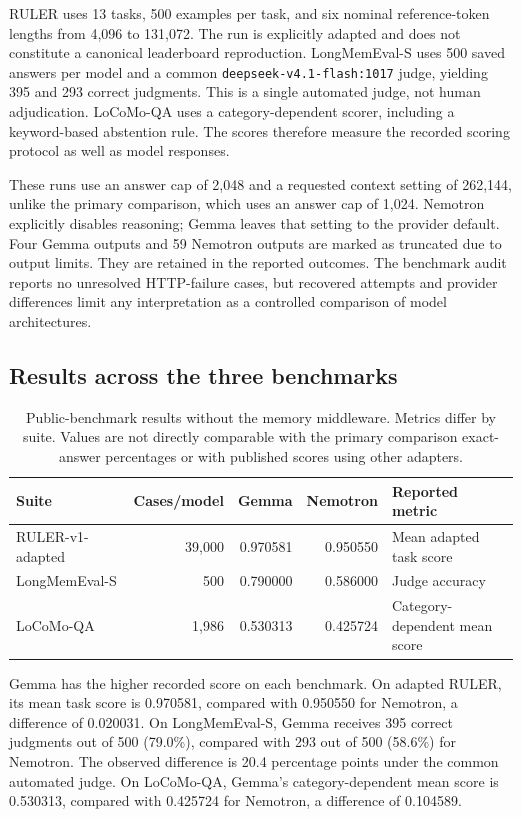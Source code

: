 \documentclass[11pt,a4paper]{article}
\begin{document}
RULER uses 13 tasks, 500 examples per task, and six nominal reference-token lengths from 4,096 to 131,072. The run is explicitly adapted and does not constitute a canonical leaderboard reproduction. LongMemEval-S uses 500 saved answers per model and a common \texttt{deepseek-v4.1-flash:1017} judge, yielding 395 and 293 correct judgments. This is a single automated judge, not human adjudication. LoCoMo-QA uses a category-dependent scorer, including a keyword-based abstention rule. The scores therefore measure the recorded scoring protocol as well as model responses.

These runs use an answer cap of 2,048 and a requested context setting of 262,144, unlike the primary comparison, which uses an answer cap of 1,024. Nemotron explicitly disables reasoning; Gemma leaves that setting to the provider default. Four Gemma outputs and 59 Nemotron outputs are marked as truncated due to output limits. They are retained in the reported outcomes. The benchmark audit reports no unresolved HTTP-failure cases, but recovered attempts and provider differences limit any interpretation as a controlled comparison of model architectures.

\subsection{Results across the three benchmarks}
\begin{table}[H]
\centering\small
\begin{tabular}{lrrrl}
\toprule
Suite & Cases/model & Gemma & Nemotron & Reported metric \\
\midrule
RULER-v1-adapted & 39,000 & 0.970581 & 0.950550 & Mean adapted task score \\
LongMemEval-S & 500 & 0.790000 & 0.586000 & Judge accuracy \\
LoCoMo-QA & 1,986 & 0.530313 & 0.425724 & Category-dependent mean score \\
\bottomrule
\end{tabular}
\caption{Public-benchmark results without the memory middleware. Metrics differ by suite. Values are not directly comparable with the primary comparison exact-answer percentages or with published scores using other adapters.}
\end{table}

Gemma has the higher recorded score on each benchmark. On adapted RULER, its mean task score is 0.970581, compared with 0.950550 for Nemotron, a difference of 0.020031. On LongMemEval-S, Gemma receives 395 correct judgments out of 500 (79.0\%), compared with 293 out of 500 (58.6\%) for Nemotron. The observed difference is 20.4 percentage points under the common automated judge. On LoCoMo-QA, Gemma's category-dependent mean score is 0.530313, compared with 0.425724 for Nemotron, a difference of 0.104589.
\end{document}
